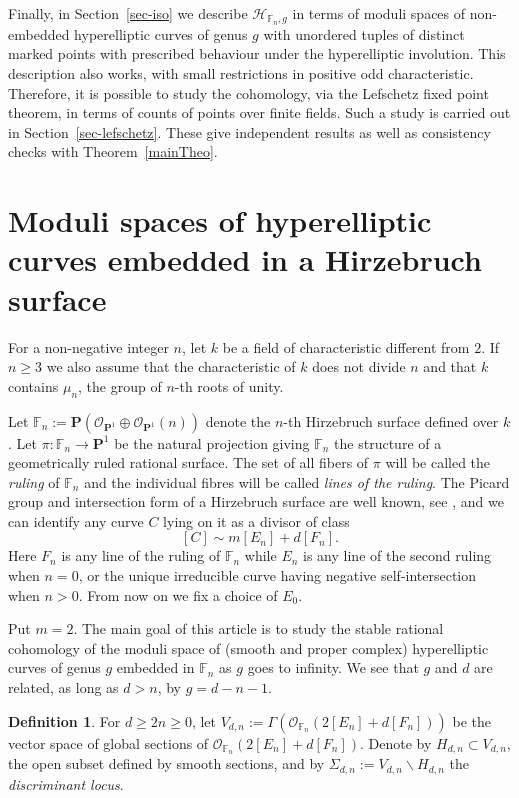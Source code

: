 \documentclass[10pt,a4paper,twoside]{amsart}
\theoremstyle{plain}
\theoremstyle{definition}
\newtheorem{defin}{Definition}
\theoremstyle{remark}
\begin{document}
Finally, in Section~\ref{sec-iso} we describe $\mathcal{H}_{\mathbb{F}_n,g}$ in terms of moduli spaces of non-embedded hyperelliptic curves of genus $g$ with unordered tuples of distinct marked points with prescribed behaviour under the hyperelliptic involution. This description also works, with small restrictions in positive odd characteristic. Therefore, it is possible to study the cohomology, via the Lefschetz fixed point theorem, in terms of counts of points over finite fields. Such a study is carried out in Section~\ref{sec-lefschetz}. These give independent results as well as consistency checks with Theorem~\ref{mainTheo}.

\section{Moduli spaces of hyperelliptic curves embedded in a Hirzebruch surface} \label{sec-hirzebruch}
For a non-negative integer $n$, let $k$ be a field of characteristic different from $2$. If $n \geq 3$ we also assume that the characteristic of $k$ does not divide $n$ and that $k$ contains $\mu_n$, the group of $n\mbox{-}$th roots of unity. 

Let $\mathbb{F}_n:=\mathbf{P}(\mathcal{O}_{\mathbf{P}^1}\oplus\mathcal{O}_{\mathbf{P}^1}(n))$ denote the $n\mbox{-}$th Hirzebruch surface defined over $k$. 
Let $\pi:\mathbb{F}_n\rightarrow \mathbf{P}^1$ be the natural projection giving $\mathbb{F}_n$ the structure of a geometrically ruled rational surface.
The set of all fibers of $\pi$ will be called the \emph{ruling} of $\mathbb{F}_n$ and the individual fibres will be called \emph{lines of the ruling}. The Picard group and intersection form of a Hirzebruch surface are well known, see \cite[V.2]{Har}, and we can identify any curve $C$ lying on it as a divisor of class
$$[C]\sim m\left[E_n\right]+d\left[F_n\right].$$
Here $F_n$ is any line of the ruling of $\mathbb{F}_n$ while $E_n$ is any line of the second ruling when $n=0$, or the unique irreducible curve having negative self-intersection when $n>0$. From now on we fix a choice of $E_0$. 

Put $m=2$. The main goal of this article is to study the stable rational cohomology of the moduli space of (smooth and proper complex) hyperelliptic curves of genus $g$ embedded in $\mathbb{F}_n$ as $g$ goes to infinity. We see that $g$ and $d$ are related, as long as $d > n$, by $g=d-n-1$. 

\begin{defin}
    For $d \geq 2n \geq 0$, let $V_{d,n}:=\Gamma(\mathcal{O}_{\mathbb{F}_n}(2[E_n]+d[F_n]))$ be the vector space of global sections of $\mathcal{O}_{\mathbb{F}_n}(2[E_n]+d[F_n])$.  Denote by $H_{d,n}\subset V_{d,n}$, the open subset defined by smooth sections, and by $\Sigma_{d,n}:=V_{d,n}\backslash H_{d,n}$ the \emph{discriminant locus}.
\end{defin}
\end{document}
